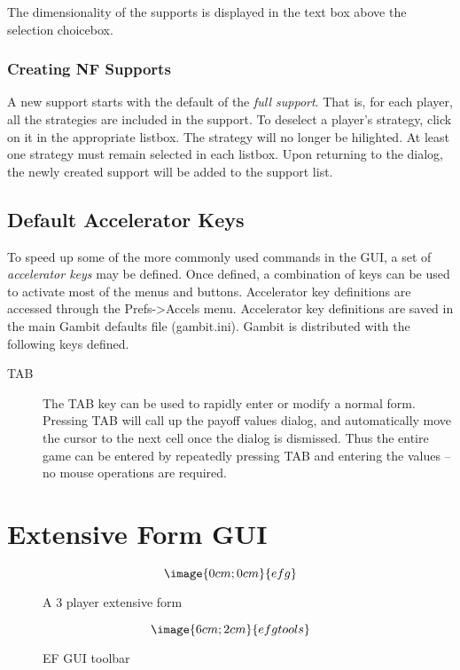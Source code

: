 The dimensionality of the supports is displayed in the text box above the selection
choicebox.

\subsubsection{Creating NF Supports}\label{NewSupport}
A new support starts with the default of the {\em full support}.  That is, for each player,
all the strategies are included in the support.  To deselect a player's strategy, click on it
in the appropriate listbox.  The strategy will no longer be hilighted.  At least one strategy
must remain selected in each listbox.  Upon returning to the 
 dialog, the newly created support will be added
to the support list.

\subsection{Default Accelerator Keys}\label{NormFormDefAccl}
To speed up some of the more commonly used commands in the GUI, a set of
{\em accelerator keys} may be defined.  Once defined, a combination of keys
can be used to activate most of the menus and buttons.  Accelerator key
definitions are accessed through the Prefs->Accels menu.  Accelerator key
definitions are saved in the main Gambit defaults file (gambit.ini).  Gambit
is distributed with the following keys defined.
\begin{description}
\item[TAB] The TAB key can be used to rapidly enter or modify a normal form.
Pressing TAB will call up the payoff values dialog, and automatically move
the cursor to the next cell once the dialog is dismissed.  Thus the entire
game can be entered by repeatedly pressing TAB and entering the values --
no mouse operations are required.
\end{description}

\section{Extensive Form GUI}

\begin{figure}
$$\image{0cm;0cm}{efg}$$
\caption{A 3 player extensive form}\label{fig_efg}
\end{figure}

\begin{figure}
$$\image{6cm;2cm}{efgtools}$$
\caption{EF GUI toolbar}\label{fig_efgtools}
\end{figure}

